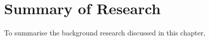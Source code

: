         
         
        
        
        
    
        
       
       

\section{Summary of Research}
To summarise the background research discussed in this chapter, 